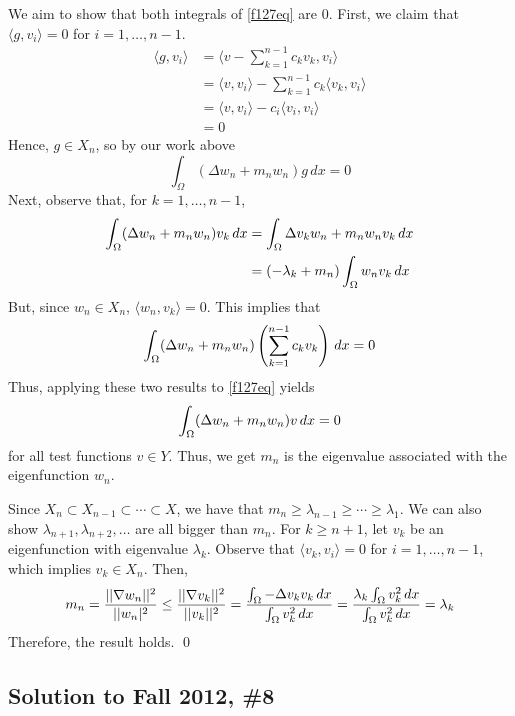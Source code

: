We aim to show that both integrals of \eqref{f127eq} are 0. First, we claim that $\langle g, v_i \rangle = 0$ for $i = 1, \dots, n-1$.
\begin{align*}
\langle g, v_i \rangle &= \langle v - \sum_{k=1}^{n-1} c_k v_k, v_i \rangle \\
&= \langle v, v_i \rangle - \sum_{k=1}^{n-1} c_k \langle v_k, v_i \rangle \\
&= \langle v, v_i \rangle - c_i \langle v_i, v_i \rangle \\
&= 0
\end{align*}
Hence, $g \in X_n$, so by our work above
$$
\int_{\Omega} (\Delta w_n + m_n w_n )g \, dx = 0
$$
Next, observe that, for $k = 1, \dots, n-1$,
\begin{align*}
\int_{\Omega} (\Delta w_n + m_n w_n) v_k \, dx &= \int_{\Omega} \Delta v_k w_n + m_n w_n v_k \, dx \\
&= (-\lambda_k + m_n) \int_{\Omega} w_n v_k \, dx
\end{align*}
But, since $w_n \in X_n$, $\langle w_n, v_k \rangle = 0$. This implies that
$$
\int_{\Omega} (\Delta w_n + m_n w_n) \left( \sum_{k=1}^{n-1} c_k v_k \right) \, dx = 0
$$
Thus, applying these two results to \eqref{f127eq} yields
\[
\int_{\Omega} (\Delta w_n + m_n w_n)v \, dx = 0
\]
for all test functions $v \in Y$. Thus, we get $m_n$ is the eigenvalue associated with the eigenfunction $w_n$.

Since $X_n \subset X_{n-1} \subset \cdots \subset X$, we have that $m_n \geq \lambda_{n-1} \geq \cdots \geq \lambda_1$. We can also show $\lambda_{n+1}, \lambda_{n+2}, \dots$ are all bigger than $m_n$. For $k \geq n+1$, let $v_k$ be an eigenfunction with eigenvalue $\lambda_k$. Observe that $\langle v_k, v_i \rangle = 0$ for $ i = 1, \dots, n-1$, which implies $v_k \in X_n$. Then,
\[
m_n = \frac{|| \nabla w_n||^2}{||w_n|^2} \leq \frac{|| \nabla v_k||^2}{||v_k||^2} = \frac{\int_{\Omega} -\Delta v_k v_k \, dx}{\int_{\Omega} v_k^2 \, dx} = \frac{\lambda_k \int_{\Omega} v_k^2 \, dx}{\int_{\Omega} v_k^2 \, dx} = \lambda_k
\]
Therefore, the result holds. \hfill \qed


\subsection*{Solution to Fall 2012, \#8}
\label{F12Q8}

